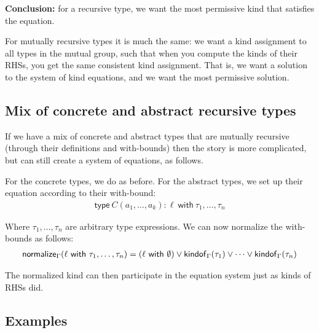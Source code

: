 \documentclass{article}
\newcommand{\type}{\mathsf{type\ }}
\newcommand{\with}{\mathsf{\ with\ }}
\newcommand{\normalize}{\mathsf{normalize}}
\begin{document}
\textbf{Conclusion:} for a recursive type, we want the most permissive kind that satisfies the equation.

For mutually recursive types it is much the same: we want a kind assignment to all types in the mutual group, such that when you compute the kinds of their RHSs, you get the same consistent kind assignment. That is, we want a solution to the system of kind equations, and we want the most permissive solution.

\subsection{Mix of concrete and abstract recursive types}

If we have a mix of concrete and abstract types that are mutually recursive (through their definitions and with-bounds) then the story is more complicated, but can still create a system of equations, as follows.

For the concrete types, we do as before.
For the abstract types, we set up their equation according to their with-bound:
\begin{align*}
    \type C(a_1,\dots,a_k) : \ell \with \tau_1,\dots,\tau_n
\end{align*}

Where $\tau_1,\dots,\tau_n$ are arbitrary type expressions.
We can now normalize the with-bounds as follows:
\begin{align*}
    \normalize_\Gamma(\ell \with \tau_1,\dots,\tau_n) = (\ell \with \emptyset) \vee \kindof(\tau_1) \vee \dots \vee \kindof(\tau_n)
\end{align*}

The normalized kind can then participate in the equation system just as kinds of RHSs did.

\subsection{Examples}
\end{document}
